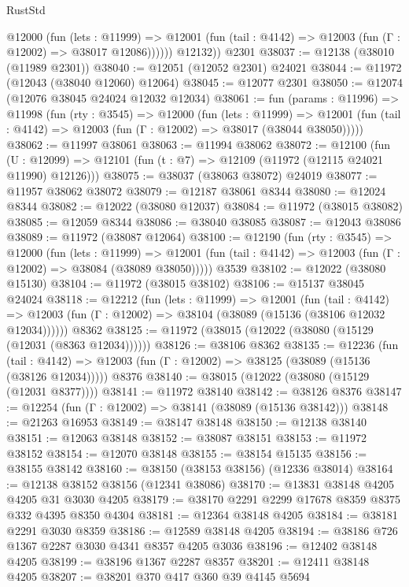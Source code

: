 \begin{lexlean}{RustStd}
\begin{coremodule}
            @12000
              (fun (lets : @11999) =>
              @12001 (fun (tail : @4142) => @12003 (fun (Γ : @12002) => @38017 @12086))))))
        @12132))
    @2301
@38037 := @12138 (@38010 (@11989 @2301))
@38040 := @12051 (@12052 @2301) @24021
@38044 := @11972 (@12043 (@38040 @12060) @12064)
@38045 := @12077 @2301
@38050 := @12074 (@12076 @38045 @24024 @12032 @12034)
@38061 := fun (params : @11996) =>
  @11998
    (fun (rty : @3545) =>
    @12000
      (fun (lets : @11999) =>
      @12001 (fun (tail : @4142) => @12003 (fun (Γ : @12002) => @38017 (@38044 @38050)))))
@38062 := @11997 @38061
@38063 := @11994 @38062
@38072 := @12100
    (fun (U : @12099) => @12101 (fun (t : @7) => @12109 (@11972 (@12115 @24021 @11990) @12126)))
@38075 := @38037 (@38063 @38072) @24019
@38077 := @11957 @38062 @38072
@38079 := @12187 @38061 @8344
@38080 := @12024 @8344
@38082 := @12022 (@38080 @12037)
@38084 := @11972 (@38015 @38082)
@38085 := @12059 @8344
@38086 := @38040 @38085
@38087 := @12043 @38086
@38089 := @11972 (@38087 @12064)
@38100 := @12190
    (fun (rty : @3545) =>
    @12000
      (fun (lets : @11999) =>
      @12001 (fun (tail : @4142) => @12003 (fun (Γ : @12002) => @38084 (@38089 @38050)))))
    @3539
@38102 := @12022 (@38080 @15130)
@38104 := @11972 (@38015 @38102)
@38106 := @15137 @38045 @24024
@38118 := @12212
    (fun (lets : @11999) =>
    @12001
      (fun (tail : @4142) =>
      @12003 (fun (Γ : @12002) => @38104 (@38089 (@15136 (@38106 @12032 @12034))))))
    @8362
@38125 := @11972 (@38015 (@12022 (@38080 (@15129 (@12031 (@8363 @12034))))))
@38126 := @38106 @8362
@38135 := @12236
    (fun (tail : @4142) => @12003 (fun (Γ : @12002) => @38125 (@38089 (@15136 (@38126 @12034)))))
    @8376
@38140 := @38015 (@12022 (@38080 (@15129 (@12031 @8377))))
@38141 := @11972 @38140
@38142 := @38126 @8376
@38147 := @12254 (fun (Γ : @12002) => @38141 (@38089 (@15136 @38142)))
@38148 := @21263 @16953
@38149 := @38147 @38148
@38150 := @12138 @38140
@38151 := @12063 @38148
@38152 := @38087 @38151
@38153 := @11972 @38152
@38154 := @12070 @38148
@38155 := @38154 @15135
@38156 := @38155 @38142
@38160 := @38150 (@38153 @38156) (@12336 @38014)
@38164 := @12138 @38152 @38156 (@12341 @38086)
@38170 := @13831 @38148 @4205 @4205 @31 @3030 @4205
@38179 := @38170 @2291 @2299 @17678 @8359 @8375 @332 @4395 @8350 @4304
@38181 := @12364 @38148 @4205
@38184 := @38181 @2291 @3030 @8359
@38186 := @12589 @38148 @4205
@38194 := @38186 @726 @1367 @2287 @3030 @4341 @8357 @4205 @3036
@38196 := @12402 @38148 @4205
@38199 := @38196 @1367 @2287 @8357
@38201 := @12411 @38148 @4205
@38207 := @38201 @370 @417 @360 @39 @4145 @5694

\end{coremodule}
\end{lexlean}
